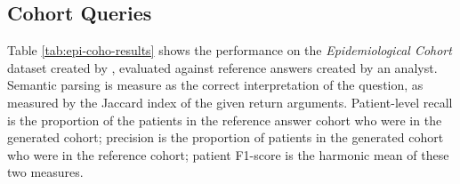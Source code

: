 \documentclass[11pt]{article}
\begin{document}
\subsection{Cohort Queries}
Table \ref{tab:epi-coho-results} shows the performance on the \textit{Epidemiological Cohort} dataset created by \citet{ziletti_generating_2025}, evaluated against reference answers created by an analyst.
Semantic parsing is measure as the correct interpretation of the question, as measured by the Jaccard index of the given return arguments.
Patient-level recall is the proportion of the patients in the reference answer cohort who were in the generated cohort; precision is the proportion of patients in the generated cohort who were in the reference cohort; patient F1-score is the harmonic mean of these two measures.

\begin{table}[ht!]
\centering
{}
\caption{
    QueryAgent's (QA) performance on 35 epidemiological cohort questions, with and without the Information Retrieval (IR) sub-agent, and with/without access to UMLS. We assess accuracy as a) whether or not the retrieved dataset exactly matches the expected dataset b) whether the type of query is correct, e.g. a count of patients versus a list of patients. Performance is automatically evaluated using an analyst created answer as ground-truth and averaged at the query level. 
}

\label{tab:epi-coho-results}
\end{table}
\end{document}

